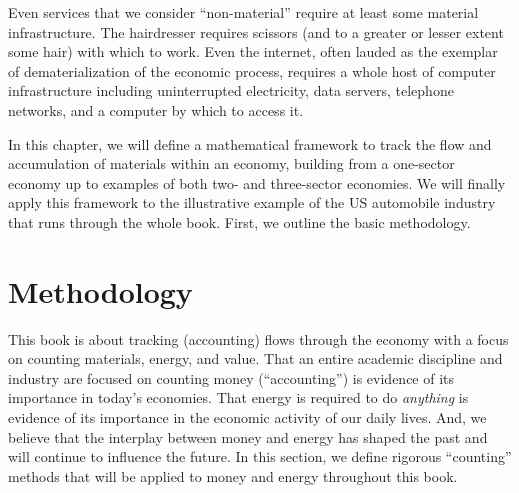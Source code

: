 Even services that we consider ``non-material'' require at least some material
infrastructure. The hairdresser requires scissors (and to a greater or lesser extent 
some hair) with which to work. Even the internet, often lauded as the exemplar of
dematerialization of the economic process, requires a whole host of computer
infrastructure including uninterrupted electricity, data servers, 
telephone networks, and a computer by which to access it.

In this chapter, we will define a mathematical framework 
to track the flow and accumulation of
materials within an economy, 
building from a one-sector economy up to examples of both
two- and three-sector economies. 
We will finally apply this framework to the illustrative
example of the US automobile industry that runs through the whole book. 
First, we outline the basic methodology.

\section{Methodology}
\label{sec:Materials_Methodology}



This book is about tracking (accounting) flows through the 
economy with a focus on counting materials, energy, and value.
That an entire academic discipline and industry are focused on counting money (``accounting'')
is evidence of its importance in today's economies.
That energy is required to do \emph{anything} is evidence 
of its importance in the economic activity of our daily lives.
And, we believe that the interplay between money and energy
has shaped the past and will continue to influence the future.
In this section, we define rigorous ``counting'' methods that will be applied
to money and energy throughout this book.

